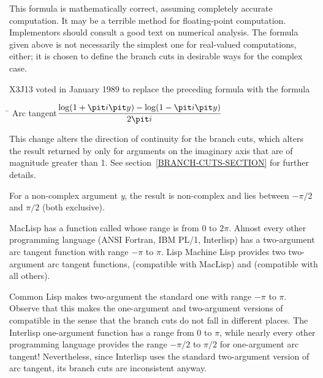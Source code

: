\begin{defun}[Function]
\newpage%

\beforenoterule
\begin{implementation}
This formula is mathematically correct, assuming
completely accurate computation.  It may be a terrible method for
floating-point computation.  Implementors should consult a good text on
numerical analysis.  The formula given above is not necessarily
the simplest one for real-valued computations, either; it is chosen
to define the branch cuts in desirable ways for the complex case.
\end{implementation}
\afternoterule

\begin{new}
X3J13 voted in January 1989
to replace the preceding formula with the formula
\begin{tabbing}
\hskip 10pc\=\kill
Arc tangent\>\( \displaystyle { \log (1+{\it i}{\it y}) - \log (1-{\it i}{\it y}) \over 2{\it i} } \)
\end{tabbing}
This change alters the direction of continuity for the
branch cuts, which alters the result returned by 
only for arguments on the imaginary axis that
are of magnitude greater than 1.
See section~\ref{BRANCH-CUTS-SECTION} for further details.
\end{new}

For a non-complex argument {\it y}, the result is non-complex and lies between
$-\pi/2$ and $\pi/2$ (both exclusive).

\beforenoterule
\begin{incompatibility}
MacLisp has a function called  whose
range is from 0 to $2\pi$.  Almost every other programming language
(ANSI Fortran, IBM PL/1, Interlisp) has a two-argument arc tangent
function with range $-\pi$ to $\pi$.
Lisp Machine Lisp provides two two-argument
arc tangent functions,  (compatible with MacLisp)
and  (compatible with all others).

Common Lisp makes two-argument  the standard one
with range $-\pi$ to $\pi$.  Observe that this makes
the one-argument and two-argument versions of  compatible
in the sense that the branch cuts do not fall in different places.
The Interlisp one-argument function  has a range
from 0 to $\pi$, while nearly every other programming language
provides the range $-\pi/2$ to $\pi/2$ for
one-argument arc tangent!
Nevertheless, since Interlisp uses the standard two-argument
version of arc tangent, its branch cuts are inconsistent anyway.
\end{incompatibility}
\afternoterule
\end{defun}

